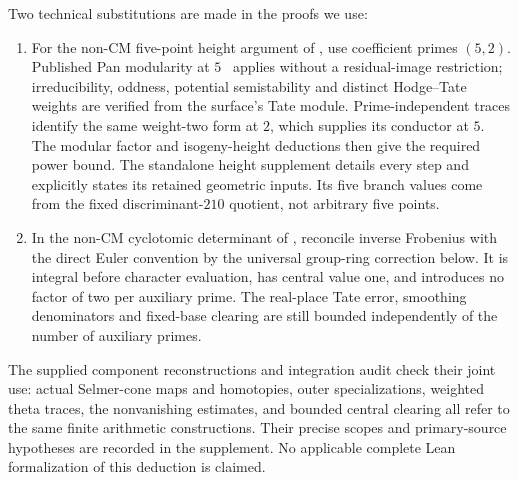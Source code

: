 \documentclass[11pt]{article}
\begin{document}
Two technical substitutions are made in the proofs we use:
\begin{enumerate}
\item For the non-CM five-point height argument of \cite{OpenAI}, use
coefficient primes $(5,2)$. Published Pan modularity at $5$~\cite{Pan}
applies without a residual-image restriction; irreducibility, oddness,
potential semistability and distinct Hodge--Tate weights are verified
from the surface's Tate module. Prime-independent traces identify the
same weight-two form at $2$, which supplies its conductor at $5$.
The modular factor and isogeny-height deductions then give the required
power bound. The standalone height supplement details every step and
explicitly states its retained geometric inputs. Its five branch values
come from the fixed discriminant-$210$ quotient, not arbitrary five points.
\item In the non-CM cyclotomic determinant of \cite{TwoConverse}, reconcile
inverse Frobenius with the direct Euler convention by the universal
group-ring correction below. It is integral before character evaluation,
has central value one, and introduces no factor of two per auxiliary prime.
The real-place Tate error, smoothing denominators and fixed-base clearing
are still bounded independently of the number of auxiliary primes.
\end{enumerate}
The supplied component reconstructions and integration audit check their
joint use: actual Selmer-cone maps and homotopies, outer specializations,
weighted theta traces, the nonvanishing estimates, and bounded central
clearing all refer to the same finite arithmetic constructions. Their
precise scopes and primary-source hypotheses are recorded in the supplement.
No applicable complete Lean formalization of this deduction is claimed.
\end{document}
